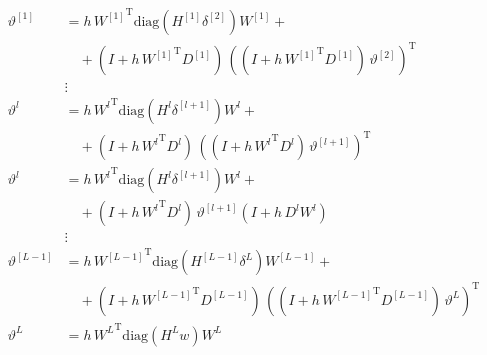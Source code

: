 \begin{align*}
    \vartheta^{[1]} & = h \, {W^{[1]}}^{\mathrm{T}} \mathrm{diag} \left( H^{[1]} \delta^{[2]} \right) W^{[1]} + \\
    & \quad + \left( I + h \, {W^{[1]}}^{\mathrm{T}} D^{[1]} \right) \, \left( \left( I + h \, {W^{[1]}}^{\mathrm{T}} D^{[1]} \right) \, \vartheta^{[2]} \right)^{\mathrm{T}} \\ 
    &\vdots\\
    \vartheta^{l} & = h \, {W^{l}}^{\mathrm{T}} \mathrm{diag} \left( H^{l} \delta^{[l+1]} \right) W^{l} + \\
    & \quad + \left( I + h \, {W^{l}}^{\mathrm{T}} D^{l} \right) \, \left( \left( I + h \, {W^{l}}^{\mathrm{T}} D^{l} \right) \, \vartheta^{[l+1]} \right)^{\mathrm{T}} \\ 
    \vartheta^{l} & = h \, {W^{l}}^{\mathrm{T}} \mathrm{diag} \left( H^{l} \delta^{[l+1]} \right) W^{l} + \\
    & \quad + \left( I + h \, {W^{l}}^{\mathrm{T}} D^{l} \right) \, \vartheta^{[l+1]}  \left( I + h \,  D^{l} {W^{l}} \right) \\ 
    &\vdots\\
    \vartheta^{[L-1]} & = h \, {W^{[L-1]}}^{\mathrm{T}} \mathrm{diag} \left( H^{[L-1]} \delta^{L} \right) W^{[L-1]} + \\
    & \quad + \left( I + h \, {W^{[L-1]}}^{\mathrm{T}} D^{[L-1]} \right) \, \left( \left( I + h \, {W^{[L-1]}}^{\mathrm{T}} D^{[L-1]} \right) \, \vartheta^{L} \right)^{\mathrm{T}} \\
    \vartheta^{L} &  = h \, {W^{L}}^{\mathrm{T}} \mathrm{diag}(H^{L} w) W^{L} 
\end{align*}

